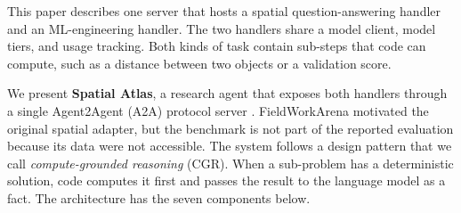 \documentclass{article}
\begin{document}
This paper describes one server that hosts a spatial question-answering handler and an ML-engineering handler. The two handlers share a model client, model tiers, and usage tracking. Both kinds of task contain sub-steps that code can compute, such as a distance between two objects or a validation score.

We present \textbf{Spatial Atlas}, a research agent that exposes both handlers through a single Agent2Agent (A2A) protocol server \citep{google2024a2a}. FieldWorkArena motivated the original spatial adapter, but the benchmark is not part of the reported evaluation because its data were not accessible. The system follows a design pattern that we call \emph{compute-grounded reasoning} (CGR). When a sub-problem has a deterministic solution, code computes it first and passes the result to the language model as a fact. The architecture has the seven components below.
\end{document}
